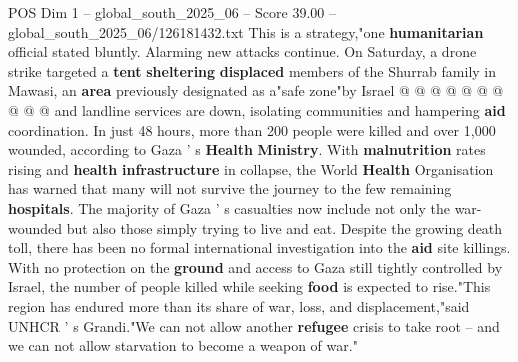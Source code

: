 \begin{textsample}{POS Dim 1 – global\_south\_2025\_06 – Score 39.00 – global\_south\_2025\_06/126181432.txt}
This is a strategy,"one \textbf{humanitarian} official stated bluntly.
Alarming new attacks continue.
On Saturday, a drone strike targeted a \textbf{tent} \textbf{sheltering} \textbf{displaced} members of the Shurrab family in Mawasi, an \textbf{area} previously designated as a"safe zone"by Israel @ @ @ @ @ @ @ @ @ @ and landline services are down, isolating communities and hampering \textbf{aid} coordination.
In just 48 hours, more than 200 people were killed and over 1,000 wounded, according to Gaza ' s \textbf{Health} \textbf{Ministry}.
With \textbf{malnutrition} rates rising and \textbf{health} \textbf{infrastructure} in collapse, the World \textbf{Health} Organisation has warned that many will not survive the journey to the few remaining \textbf{hospitals}.
The majority of Gaza ' s casualties now include not only the war-wounded but also those simply trying to live and eat.
Despite the growing death toll, there has been no formal international investigation into the \textbf{aid} site killings.
With no protection on the \textbf{ground} and access to Gaza still tightly controlled by Israel, the number of people killed while seeking \textbf{food} is expected to rise."This region has endured more than its share of war, loss, and displacement,"said UNHCR ' s Grandi."We can not allow another \textbf{refugee} crisis to take root -- and we can not allow starvation to become a weapon of war."

\end{textsample}
